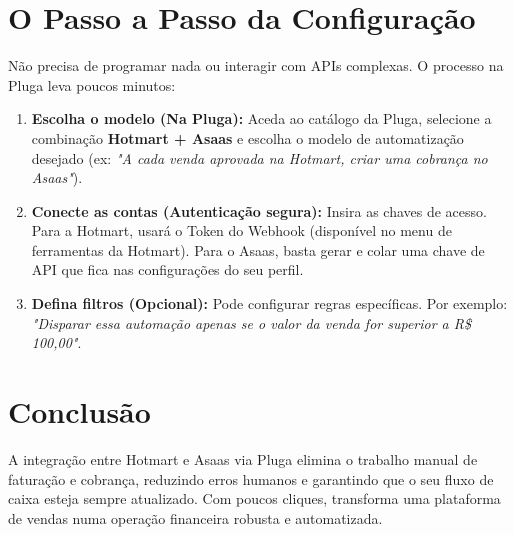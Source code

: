 \documentclass[11pt,a4paper]{article}
\begin{document}
\section{O Passo a Passo da Configuração}
Não precisa de programar nada ou interagir com APIs complexas. O processo na Pluga leva poucos minutos:

\begin{enumerate}[leftmargin=*]
    \item \textbf{Escolha o modelo (Na Pluga):} Aceda ao catálogo da Pluga, selecione a combinação \textbf{Hotmart + Asaas} e escolha o modelo de automatização desejado (ex: \textit{"A cada venda aprovada na Hotmart, criar uma cobrança no Asaas"}).
    \item \textbf{Conecte as contas (Autenticação segura):} Insira as chaves de acesso. Para a Hotmart, usará o Token do Webhook (disponível no menu de ferramentas da Hotmart). Para o Asaas, basta gerar e colar uma chave de API que fica nas configurações do seu perfil.
    \item \textbf{Defina filtros (Opcional):} Pode configurar regras específicas. Por exemplo: \textit{"Disparar essa automação apenas se o valor da venda for superior a R\$ 100,00"}.
\end{enumerate}

\section{Conclusão}
A integração entre Hotmart e Asaas via Pluga elimina o trabalho manual de faturação e cobrança, reduzindo erros humanos e garantindo que o seu fluxo de caixa esteja sempre atualizado. Com poucos cliques, transforma uma plataforma de vendas numa operação financeira robusta e automatizada.
\end{document}
